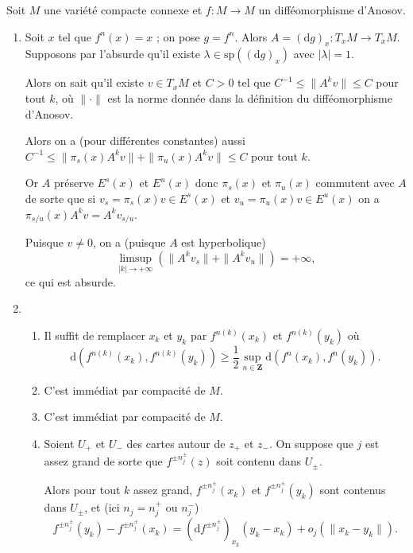 \documentclass[a4paper,12pt,openany]{article}
\theoremstyle{plain}
\theoremstyle{definition}
\newcommand{\dd}{\mathrm{d}}
\newcommand{\Z}{\mathbf{Z}}
\begin{document}
 \vspace{1.5mm} 

\noindent Soit $M$ une vari\'et\'e compacte connexe
 et $f : M \to M$ un diff\'eomorphisme d'Anosov. 

\begin{enumerate}
\item Soit $x$ tel que $f^n(x) = x$ ; on pose $g = f^n$. Alors $A = (\dd g)_x : T_x M \to T_xM$. Supposons par l'absurde qu'il existe $\lambda \in \mathrm{sp}((\dd g)_x)$ avec $|\lambda| = 1$.




Alors on sait qu'il existe $v \in T_xM$ et $C > 0$ tel que $C^{-1} \leqslant \|A^kv\| \leqslant C$ pour tout $k$, o\`u $\| \cdot\|$ est la norme donn\'ee dans la d\'efinition du diff\'eomorphisme d'Anosov.




Alors on a (pour diff\'erentes constantes) aussi $C^{-1} \leqslant \|\pi_s(x)A^k v\| + \|\pi_u(x)A^k v\| \leqslant C$ pour tout $k$. 



Or $A$ pr\'eserve $E^s(x)$ et $E^u(x)$ donc $\pi_s(x)$ et $\pi_u(x)$ commutent avec $A$ de sorte que si $v_s = \pi_s(x) v \in E^s(x)$ et $v_u =  \pi_u(x) v \in E^u(x)$ on a $\pi_{s/u}(x)A^kv = A^kv_{s/u}$.



Puisque $v \neq 0$, on a (puisque $A$ est hyperbolique)
$$\limsup_{|k| \to +\infty}\left(\|A^kv_s\| + \|A^kv_u\|\right) = +\infty,$$
ce qui est absurde.

\item
\begin{enumerate}
\item Il suffit de remplacer $x_k$ et $y_k$ par $f^{n(k)}(x_k)$ et $f^{n(k)}(y_k)$ o\`u 
$$
\dd\left(f^{n(k)}(x_k), f^{n(k)}(y_k)\right) \geqslant \frac{1}{2} \sup_{n \in \Z} \dd\left(f^n(x_k), f^n(y_k)\right).
$$


\item C'est imm\'ediat par compacit\'e de $M$.
\item C'est imm\'ediat par compacit\'e de $M$.
\item Soient $U_+$ et $U_-$ des cartes autour de $z_+$ et $z_-$. On suppose que $j$ est assez grand de sorte que $f^{\pm n_j^\pm}(z)$ soit contenu dans $U_\pm$.




Alors pour tout $k$ assez grand, $f^{\pm n_j^\pm}(x_k)$ et $f^{\pm n_j^\pm}(y_k)$ sont contenus dans $U_\pm$, et (ici $n_j = n_j^+$ ou $n_j^-$)
$$
f^{\pm n_j^\pm}(y_k) - f^{\pm n_j^\pm}(x_k) = \left(\dd f^{\pm n_j^\pm}\right)_{x_k}(y_k-x_k) + o_j(\|x_k - y_k\|).
$$


\end{enumerate}
\end{enumerate}
\end{document}
